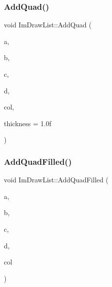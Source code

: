 \subsubsection{\texorpdfstring{Add\+Quad()}{AddQuad()}}
{\footnotesize\ttfamily void Im\+Draw\+List\+::\+Add\+Quad (\begin{DoxyParamCaption}\item[{const \hyperlink{struct_im_vec2}{Im\+Vec2} \&}]{a,  }\item[{const \hyperlink{struct_im_vec2}{Im\+Vec2} \&}]{b,  }\item[{const \hyperlink{struct_im_vec2}{Im\+Vec2} \&}]{c,  }\item[{const \hyperlink{struct_im_vec2}{Im\+Vec2} \&}]{d,  }\item[{Im\+U32}]{col,  }\item[{float}]{thickness = {\ttfamily 1.0f} }\end{DoxyParamCaption})}

\hypertarget{struct_im_draw_list_abefdc71c2dc6b6331193aee3ff680ed0}{}\label{struct_im_draw_list_abefdc71c2dc6b6331193aee3ff680ed0} 
\subsubsection{\texorpdfstring{Add\+Quad\+Filled()}{AddQuadFilled()}}
{\footnotesize\ttfamily void Im\+Draw\+List\+::\+Add\+Quad\+Filled (\begin{DoxyParamCaption}\item[{const \hyperlink{struct_im_vec2}{Im\+Vec2} \&}]{a,  }\item[{const \hyperlink{struct_im_vec2}{Im\+Vec2} \&}]{b,  }\item[{const \hyperlink{struct_im_vec2}{Im\+Vec2} \&}]{c,  }\item[{const \hyperlink{struct_im_vec2}{Im\+Vec2} \&}]{d,  }\item[{Im\+U32}]{col }\end{DoxyParamCaption})}

\hypertarget{struct_im_draw_list_ac4a9baaadd92d203f61c395f6158c7e6}{}\label{struct_im_draw_list_ac4a9baaadd92d203f61c395f6158c7e6} 
